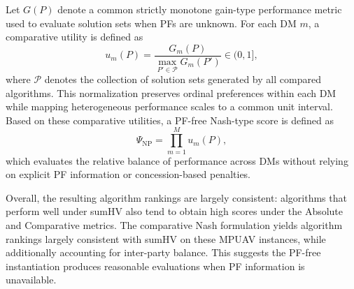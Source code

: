\documentclass[journal]{IEEEtran}
\begin{document}
Let $G(P)$ denote a common strictly monotone gain-type performance metric used to evaluate solution sets when PFs are unknown. For each DM $m$, a comparative utility is defined as
\[
u_m(P)=\frac{G_m(P)}{\max_{P'\in\mathcal{P}} G_m(P')} \in (0,1],
\]
where $\mathcal{P}$ denotes the collection of solution sets generated by all compared algorithms. This normalization preserves ordinal preferences within each DM while mapping heterogeneous performance scales to a common unit interval. Based on these comparative utilities, a PF-free Nash-type score is defined as
\[
\Psi_{\mathrm{NP}} = \prod_{m=1}^{M} u_m(P),
\]
which evaluates the relative balance of performance across DMs without relying on explicit PF information or concession-based penalties.

Overall, the resulting algorithm rankings are largely consistent: algorithms that perform well under sumHV also tend to obtain high scores under the Absolute and Comparative metrics. The comparative Nash formulation yields algorithm rankings largely consistent with sumHV on these MPUAV instances, while additionally accounting for inter-party balance. This suggests the PF-free instantiation produces reasonable evaluations when PF information is unavailable.
\end{document}
